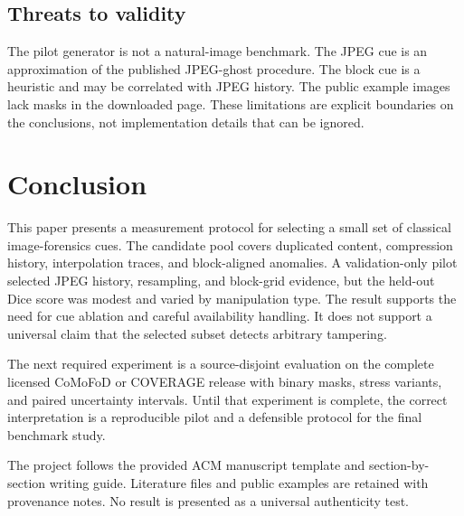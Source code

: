 \documentclass[sigconf,nonacm]{acmart}
\begin{document}
\subsection{Threats to validity}
The pilot generator is not a natural-image benchmark. The JPEG cue is an approximation of the published JPEG-ghost procedure. The block cue is a heuristic and may be correlated with JPEG history. The public example images lack masks in the downloaded page. These limitations are explicit boundaries on the conclusions, not implementation details that can be ignored.

\section{Conclusion}
This paper presents a measurement protocol for selecting a small set of classical image-forensics cues. The candidate pool covers duplicated content, compression history, interpolation traces, and block-aligned anomalies. A validation-only pilot selected JPEG history, resampling, and block-grid evidence, but the held-out Dice score was modest and varied by manipulation type. The result supports the need for cue ablation and careful availability handling. It does not support a universal claim that the selected subset detects arbitrary tampering.

The next required experiment is a source-disjoint evaluation on the complete licensed CoMoFoD or COVERAGE release with binary masks, stress variants, and paired uncertainty intervals. Until that experiment is complete, the correct interpretation is a reproducible pilot and a defensible protocol for the final benchmark study.

\begin{acks}
The project follows the provided ACM manuscript template and section-by-section writing guide. Literature files and public examples are retained with provenance notes. No result is presented as a universal authenticity test.
\end{acks}



\end{document}
